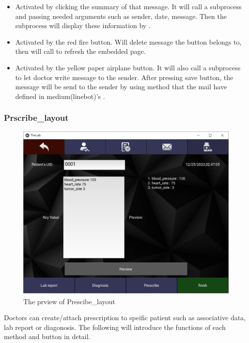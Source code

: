 \documentclass{article}
\begin{document}
\begin{itemize}
  \item {} Activated by clicking the summary of that message. It will call a subprocess and passing needed arguments such as sender, date, message. Then the subprocess will display these information by .
  \item {} Activated by the red fire button. Will delete message the button belongs to, then will call  to refresh the embedded page.
  \item {} Activated by the yellow paper airplane button. It will also call a subprocess to let doctor write message to the sender. After pressing save button, the message will be send to the sender by using  method that the mail have defined in medium(linebot)'s .
\end{itemize}

\subsubsection*{Prscribe\_layout}
\begin{figure}[ht]
  \centering
  \includegraphics[scale = 0.3]{asset/doctor_gui/frontend_prescribe.png}
  \caption{The prview of Prescibe\_layout}
  \label{fig:frontend_prescribe}
\end{figure}

Doctors can create/attach prescription to speific patient such as associative 
data, lab report or diagonosis. The following will introduce the functions of 
each method and button in detail.
\end{document}
